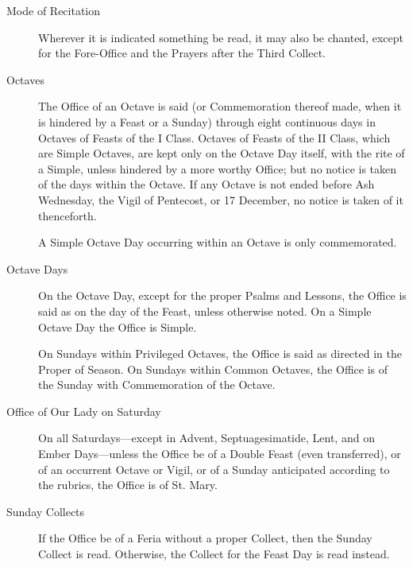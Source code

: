 \begin{description}
\item[Mode of Recitation] Wherever it is indicated something be read, it may also be chanted, except for the Fore-Office and the Prayers after the Third Collect.
\item[Octaves] The Office of an Octave is said (or Commemoration thereof made, when it is hindered by a Feast or a Sunday) through eight continuous days in Octaves of Feasts of the I Class. Octaves of Feasts of the II Class, which are Simple Octaves, are kept only on the Octave Day itself, with the rite of a Simple, unless hindered by a more worthy Office; but no notice is taken of the days within the Octave. If any Octave is not ended before Ash Wednesday, the Vigil of Pentecost, or 17 December, no notice is taken of it thenceforth.\par
A Simple Octave Day occurring within an Octave is only commemorated.
\item[Octave Days] On the Octave Day, except for the proper Psalms and Lessons, the Office is said as on the day of the Feast, unless otherwise noted. On a Simple Octave Day the Office is Simple.
\par
On Sundays within Privileged Octaves, the Office is said as directed in the Proper of Season. On Sundays within Common Octaves, the Office is of the Sunday with Commemoration of the Octave.
\item[Office of Our Lady on Saturday] On all Saturdays---except in Advent, Septuagesimatide, Lent, and on Ember Days---unless the Office be of a Double Feast (even transferred), or of an occurrent Octave or Vigil, or of a Sunday anticipated according to the rubrics, the Office is of St. Mary.
\item[Sunday Collects] %
If the Office be of a Feria without a proper Collect, then the Sunday Collect is read. Otherwise, the Collect for the Feast Day is read instead.
\end{description}

